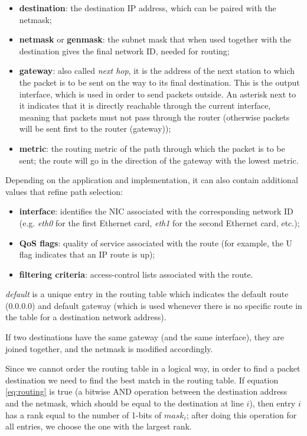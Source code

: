 \begin{itemize}
    \item \textbf{destination}: the destination IP address, which can be paired with the netmask;
    \item \textbf{netmask} or \textbf{genmask}: the subnet mask that when used together with the destination gives the final network ID, needed for routing;
    \item \textbf{gateway}: also called \textit{next hop}, it is the address of the next station to which the packet is to be sent on the way to its final destination. This is the output interface, which is used in order to send packets outside. An asterisk next to it indicates that it is directly reachable through the current interface, meaning that packets must not pass through the router (otherwise packets will be sent first to the router (gateway));
    \item \textbf{metric}: the routing metric of the path through which the packet is to be sent; the route will go in the direction of the gateway with the lowest metric.
\end{itemize}

Depending on the application and implementation, it can also contain additional values that refine path selection:

\begin{itemize}
    \item \textbf{interface}: identifies the NIC associated with the corresponding network ID (e.g. \textit{eth0} for the first Ethernet card, \textit{eth1} for the second Ethernet card, etc.);
    \item \textbf{QoS flags}: quality of service associated with the route (for example, the U flag indicates that an IP route is up);
    \item \textbf{filtering criteria}: access-control lists associated with the route.
\end{itemize}

\textit{default} is a unique entry in the routing table which indicates the default route (0.0.0.0) and default gateway (which is used whenever there is no specific route in the table for a destination network address).

If two destinations have the same gateway (and the same interface), they are joined together, and the netmask is modified accordingly.

Since we cannot order the routing table in a logical way, in order to find a packet destination we need to find the best match in the routing table. If equation \ref{eq:routing} is true (a bitwise AND operation between the destination address and the netmask, which should be equal to the destination at line $i$), then entry $i$ has a rank equal to the number of 1-bits of $mask_i$; after doing this operation for all entries, we choose the one with the largest rank.

